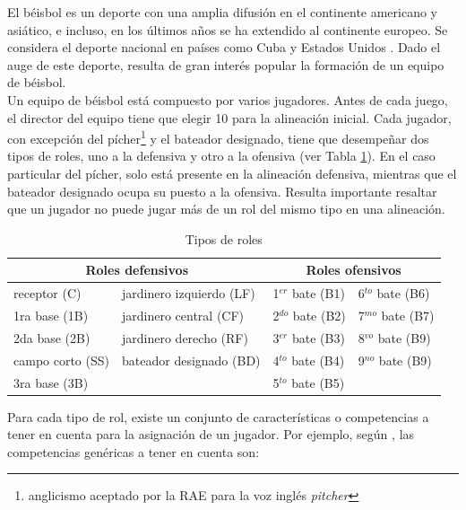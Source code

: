El béisbol es un deporte con una amplia difusión en el continente americano y asiático, e incluso, en los últimos años se ha extendido al continente europeo. Se considera el deporte nacional en países como Cuba y Estados Unidos \cite{INEFI2020}. Dado el auge de este deporte, resulta de gran interés popular la formación de un equipo de béisbol.\\

Un equipo de béisbol está compuesto por varios jugadores. Antes de cada juego, el director del equipo tiene que elegir 10 para la alineación inicial. Cada jugador, con excepción del pícher\footnote{anglicismo aceptado por la RAE para la voz inglés \textit{pitcher}} y el bateador designado, tiene que desempeñar dos tipos de roles, uno a la defensiva y otro a la ofensiva {\color{red}(ver Tabla \ref{tipo-roles1})}. En el caso particular del pícher, solo está presente en la alineación defensiva, mientras que el bateador designado ocupa su puesto a la ofensiva. Resulta importante resaltar que un jugador no puede jugar más de un rol del mismo tipo en una alineación.

\begin{table}[H]
	\centering
	\caption{Tipos de roles}\label{tipo-roles1}
		\begin{tabular}{l l l l}
			\toprule[1.7pt]
			\multicolumn{2}{c}{\textbf{Roles defensivos}} & \multicolumn{2}{c}{\textbf{Roles ofensivos}} \\ \midrule
			receptor (C)     & jardinero izquierdo (LF)   & 1$^{er}$ bate (B1) & 6$^{to}$ bate (B6)      \\
			1ra base (1B)    & jardinero central (CF)     & 2$^{do}$ bate (B2) & 7$^{mo}$ bate (B7)      \\
			2da base (2B)    & jardinero derecho (RF)     & 3$^{er}$ bate (B3) & 8$^{vo}$ bate (B9)      \\
			campo corto (SS) & bateador designado (BD)    & 4$^{to}$ bate (B4) & 9$^{no}$ bate (B9)      \\
			3ra base (3B)    &                            & 5$^{to}$ bate (B5) &                         \\ \bottomrule[1pt]
		\end{tabular}
\end{table}

Para cada tipo de rol, existe un conjunto de características o competencias a tener en cuenta para la asignación de un jugador. Por ejemplo, según \cite{Smith1995},  las competencias genéricas a tener en cuenta son:

